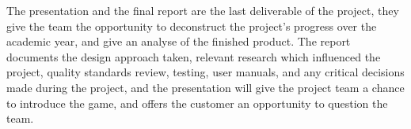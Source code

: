 The presentation and the final report are the last deliverable of the project, they give the team the opportunity to deconstruct the project's progress over the academic year, and give an analyse of the finished product. The report documents the design approach taken, relevant research which influenced the project, quality standards review, testing, user manuals, and any critical decisions made during the project, and the presentation will give the project team a chance to introduce the game, and offers the customer an opportunity to question the team. 








